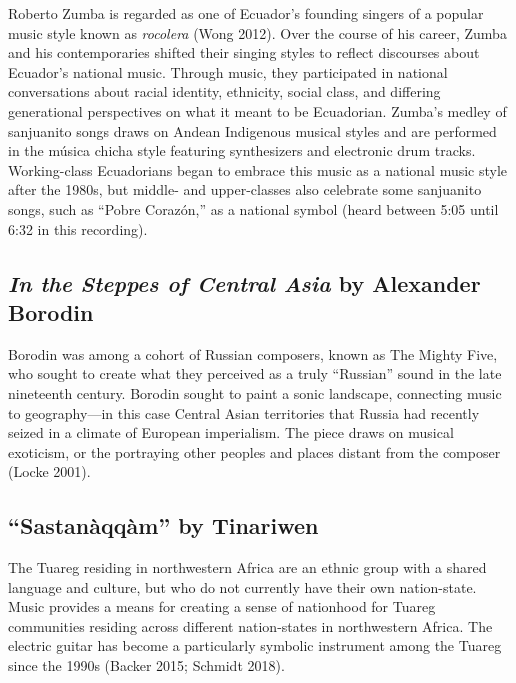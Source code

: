 \documentclass[twoside]{article}
\begin{document}
\rightskip=0pt
\spaceskip=0pt
\xspaceskip=0pt
\relax

Roberto Zumba is regarded as one of Ecuador's founding singers of a
popular music style known as \emph{rocolera} (Wong 2012). Over the
course of his career, Zumba and his contemporaries shifted their singing
styles to reflect discourses about Ecuador's national music. Through
music, they participated in national conversations about racial
identity, ethnicity, social class, and differing generational
perspectives on what it meant to be Ecuadorian. Zumba's medley of
sanjuanito songs draws on Andean Indigenous musical styles and are
performed in the música chicha style featuring synthesizers and
electronic drum tracks. Working-class Ecuadorians began to embrace this
music as a national music style after the 1980s, but middle- and
upper-classes also celebrate some sanjuanito songs, such as ``Pobre
Corazón,'' as a national symbol (heard between 5:05 until 6:32 in this
recording).

\hypertarget{in-the-steppes-of-central-asia-by-alexander-borodin}{%
\subsection*{\texorpdfstring{\emph{In the Steppes of Central Asia} by
Alexander
Borodin}{In the Steppes of Central Asia by Alexander Borodin}}\label{in-the-steppes-of-central-asia-by-alexander-borodin}}

Borodin was among a cohort of Russian composers, known as The Mighty
Five, who sought to create what they perceived as a truly ``Russian''
sound in the late nineteenth century. Borodin sought to paint a sonic
landscape, connecting music to geography---in this case Central Asian
territories that Russia had recently seized in a climate of European
imperialism. The piece draws on musical exoticism, or the portraying
other peoples and places distant from the composer (Locke 2001).~

\hypertarget{sastanuxe0qquxe0m-by-tinariwen}{%
\subsection*{``Sastanàqqàm'' by
Tinariwen}\label{sastanuxe0qquxe0m-by-tinariwen}}

The Tuareg residing in northwestern Africa are an ethnic group with a
shared language and culture, but who do not currently have their own
nation-state. Music provides a means for creating a sense of nationhood
for Tuareg communities residing across different nation-states in
northwestern Africa. The electric guitar has become a particularly
symbolic instrument among the Tuareg since the 1990s (Backer 2015;
Schmidt 2018).
\end{document}
